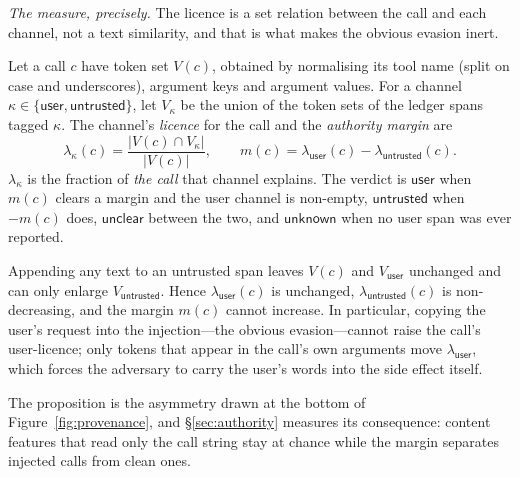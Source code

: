 \documentclass[sigconf,nonacm]{acmart}
\begin{document}
\medskip
\noindent\emph{The measure, precisely.} The licence is a set relation
between the call and each channel, not a text similarity, and that is what
makes the obvious evasion inert.

\begin{definition}
\label{def:licence}
Let a call $c$ have token set $V(c)$, obtained by normalising its tool
name (split on case and underscores), argument keys and argument values.
For a channel $\kappa\in\{\mathsf{user},\mathsf{untrusted}\}$, let
$V_\kappa$ be the union of the token sets of the ledger spans tagged
$\kappa$. The channel's \emph{licence} for the call and the
\emph{authority margin} are
\[
  \lambda_\kappa(c)=\frac{|V(c)\cap V_\kappa|}{|V(c)|},
  \qquad
  m(c)=\lambda_{\mathsf{user}}(c)-\lambda_{\mathsf{untrusted}}(c).
\]
$\lambda_\kappa$ is the fraction of \emph{the call} that channel explains.
The verdict is $\mathsf{user}$ when $m(c)$ clears a margin and the user
channel is non-empty, $\mathsf{untrusted}$ when $-m(c)$ does, $\mathsf{unclear}$
between the two, and $\mathsf{unknown}$ when no user span was ever reported.
\end{definition}

\begin{proposition}
\label{prop:asym}
Appending any text to an untrusted span leaves $V(c)$ and $V_{\mathsf{user}}$
unchanged and can only enlarge $V_{\mathsf{untrusted}}$. Hence
$\lambda_{\mathsf{user}}(c)$ is unchanged, $\lambda_{\mathsf{untrusted}}(c)$
is non-decreasing, and the margin $m(c)$ cannot increase. In particular,
copying the user's request into the injection---the obvious
evasion---cannot raise the call's user-licence; only tokens that appear in
the call's own arguments move $\lambda_{\mathsf{user}}$, which forces the
adversary to carry the user's words into the side effect itself.
\end{proposition}

\noindent The proposition is the asymmetry drawn at the bottom of
Figure~\ref{fig:provenance}, and \S\ref{sec:authority} measures its
consequence: content features that read only the call string stay at
chance while the margin separates injected calls from clean ones.
\end{document}
